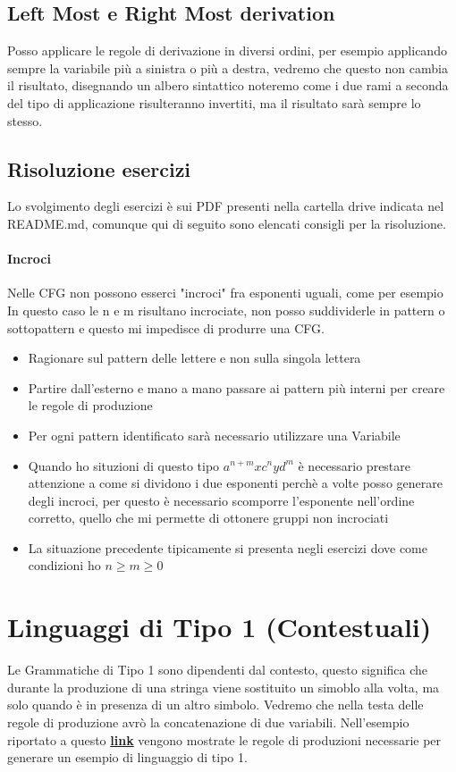 \subsection*{Left Most e Right Most derivation}
Posso applicare le regole di derivazione in diversi ordini, per esempio applicando sempre la variabile più
a sinistra o più a destra, vedremo che questo non cambia il risultato, disegnando un albero sintattico noteremo
come i due rami a seconda del tipo di applicazione risulteranno invertiti, ma il risultato sarà sempre lo stesso.
\subsection*{Risoluzione esercizi}
Lo svolgimento degli esercizi è sui PDF presenti nella cartella drive indicata nel README.md, comunque
qui di seguito sono elencati consigli per la risoluzione.
\paragraph*{Incroci} Nelle CFG non possono esserci "incroci" fra esponenti uguali, come per esempio
 In questo caso le n e m risultano incrociate, non posso suddividerle in pattern o
sottopattern e questo mi impedisce di produrre una CFG.
\begin{itemize}
    \item Ragionare sul pattern delle lettere e non sulla singola lettera
    \item Partire dall'esterno e mano a mano passare ai pattern più interni per creare le regole di produzione
    \item Per ogni pattern identificato sarà necessario utilizzare una Variabile
    \item Quando ho situzioni di questo tipo $a^{n+m}xc^n y d^m$ è necessario prestare attenzione a
    come si dividono i due esponenti perchè a volte posso generare degli incroci, per questo è necessario
    scomporre l'esponente nell'ordine corretto, quello che mi permette di ottonere gruppi non incrociati
    \item La situazione precedente tipicamente si presenta negli esercizi dove come condizioni ho $n \geq m \geq 0$
\end{itemize}

\section{Linguaggi di Tipo 1 (Contestuali)}
Le Grammatiche di Tipo 1 sono dipendenti dal contesto, questo significa che durante
la produzione di una stringa viene sostituito un simoblo alla volta, ma solo quando
è in presenza di un altro simbolo. Vedremo che nella testa delle regole di produzione
avrò la concatenazione di due variabili.
Nell'esempio riportato a questo 
{\href{https://elearning.unimib.it/pluginfile.php/1366772/mod_resource/content/3/grammatiche-tipo-1.pdf}{\textbf{link}}}
vengono mostrate le regole di produzioni necessarie per generare un esempio di linguaggio
di tipo 1. 

